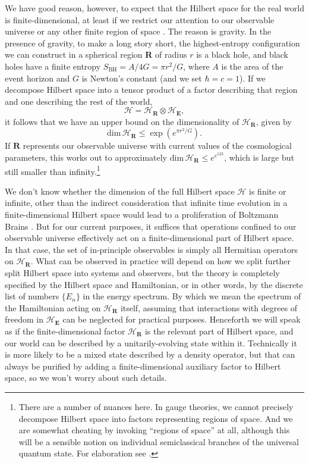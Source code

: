 \documentclass[12pt,english]{article}
\newcommand{\be}{\begin{equation}}
\newcommand{\ee}{\end{equation}}
\newcommand{\HH}{\mathcal{H}}
\begin{document}
We have good reason, however, to expect that the Hilbert space for the real world is finite-dimensional, at least if we restrict our attention to our observable universe or any other finite region of space \citep{Bekenstein:1980jp,bousso1999,Banks:2000fe,Jacobson:2012yt,Bao:2017rnv}.
The reason is gravity.
In the presence of gravity, to make a long story short, the highest-entropy configuration we can construct in a spherical region \textbf{R} of radius $r$ is a black hole, and black holes have a finite entropy $S_\mathrm{BH} = A/4G = \pi r^2/G$, where $A$ is the area of the event horizon and $G$ is Newton's constant (and we set $\hbar=c=1$).
If we decompose Hilbert space into a tensor product of a factor describing that region and one describing the rest of the world,
\be
\HH = \HH_\mathbf{R}\otimes \HH_\mathbf{E},
\label{factorization}
\ee
it follows that we have an upper bound on the dimensionality of $\HH_\mathbf{R}$, given by
\be
  \mathrm{dim}\,\HH_\mathbf{R} \leq \exp{(e^{\pi r^2/G})}.
\ee
If $\mathbf{R}$ represents our observable universe with current values of the cosmological parameters, this works out to approximately $ \mathrm{dim}\,\HH_\mathbf{R} \leq e^{e^{123}}$, which is large but still smaller than infinity.\footnote{There are a number of nuances here. In gauge theories, we cannot precisely decompose Hilbert space into factors representing regions of space. And we are somewhat cheating by invoking ``regions of space'' at all, although this will be a sensible notion on individual semiclassical branches of the universal quantum state. For elaboration see \citep{Bao:2017rnv}.}

We don't know whether the dimension of the full Hilbert space $\HH$ is finite or infinite, other than the indirect consideration that infinite time evolution in a finite-dimensional Hilbert space would lead to a proliferation of Boltzmann Brains \citep{Dyson2002,Carroll:2008yd}.
But for our current purposes, it suffices that operations confined to our observable universe effectively act on a finite-dimensional part of Hilbert space. 
In that case, the set of in-principle observables is simply all Hermitian operators on $\HH_\mathbf{R}$.
What can be observed in practice will depend on how we split further split Hilbert space into systems and observers, but the theory is completely specified by the Hilbert space and Hamiltonian, or in other words, by the discrete list of numbers $\{E_n\}$ in the energy spectrum.
By which we mean the spectrum of the Hamiltonian acting on $\HH_\mathbf{R}$ itself, assuming that interactions with degrees of freedom in $\HH_\mathbf{E}$ can be neglected for practical purposes.
Henceforth we will speak as if the finite-dimensional factor $\HH_\mathbf{R}$ is the relevant part of Hilbert space, and our world can be described by a unitarily-evolving state within it.
Technically it is more likely to be a mixed state described by a density operator, but that can always be purified by adding a finite-dimensional auxiliary factor to Hilbert space, so we won't worry about such details.
\end{document}
